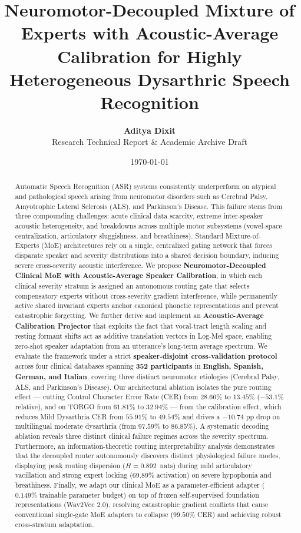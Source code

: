 \documentclass[10pt,twocolumn]{article}
\title{\textbf{Neuromotor-Decoupled Mixture of Experts with Acoustic-Average Calibration for Highly Heterogeneous Dysarthric Speech Recognition}}
\author{\textbf{Aditya Dixit}\\
\small Research Technical Report \& Academic Archive Draft}
\date{\today}
\begin{document}
\maketitle

\begin{abstract}
Automatic Speech Recognition (ASR) systems consistently underperform on atypical and pathological speech arising from neuromotor disorders such as Cerebral Palsy, Amyotrophic Lateral Sclerosis (ALS), and Parkinson's Disease. This failure stems from three compounding challenges: acute clinical data scarcity, extreme inter-speaker acoustic heterogeneity, and breakdowns across multiple motor subsystems (vowel-space centralization, articulatory sluggishness, and breathiness). Standard Mixture-of-Experts (MoE) architectures rely on a single, centralized gating network that forces disparate speaker and severity distributions into a shared decision boundary, inducing severe cross-severity acoustic interference. We propose \textbf{Neuromotor-Decoupled Clinical MoE with Acoustic-Average Speaker Calibration}, in which each clinical severity stratum is assigned an autonomous routing gate that selects compensatory experts without cross-severity gradient interference, while permanently active shared invariant experts anchor canonical phonetic representations and prevent catastrophic forgetting. We further derive and implement an \textbf{Acoustic-Average Calibration Projector} that exploits the fact that vocal-tract length scaling and resting formant shifts act as additive translation vectors in Log-Mel space, enabling zero-shot speaker adaptation from an utterance's long-term average spectrum. We evaluate the framework under a strict \textbf{speaker-disjoint cross-validation protocol} across four clinical databases spanning \textbf{352 participants} in \textbf{English, Spanish, German, and Italian}, covering three distinct neuromotor etiologies (Cerebral Palsy, ALS, and Parkinson's Disease). Our architectural ablation isolates the pure routing effect --- cutting Control Character Error Rate (CER) from $28.66\%$ to $13.45\%$ ($-53.1\%$ relative), and on TORGO from $61.81\%$ to $32.94\%$ --- from the calibration effect, which reduces Mild Dysarthria CER from $55.91\%$ to $49.54\%$ and drives a $-10.74$ pp drop on multilingual moderate dysarthria (from $97.59\%$ to $86.85\%$). A systematic decoding ablation reveals three distinct clinical failure regimes across the severity spectrum. Furthermore, an information-theoretic routing interpretability analysis demonstrates that the decoupled router autonomously discovers distinct physiological failure modes, displaying peak routing dispersion ($H=0.892$~nats) during mild articulatory vacillation and strong expert locking ($69.89\%$ activation) on severe hypophonia and breathiness. Finally, we adapt our clinical MoE as a parameter-efficient adapter ($0.149\%$ trainable parameter budget) on top of frozen self-supervised foundation representations (Wav2Vec 2.0), resolving catastrophic gradient conflicts that cause conventional single-gate MoE adapters to collapse ($99.50\%$ CER) and achieving robust cross-stratum adaptation.


\end{abstract}
\end{document}
